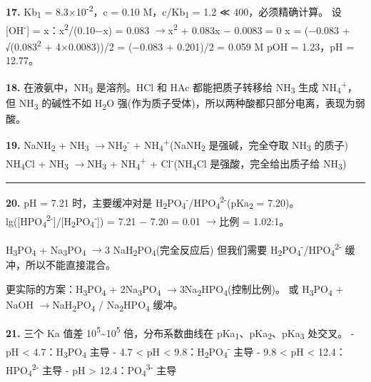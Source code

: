 \documentclass[a4paper,11pt]{ctexart}
\newcommand{\箭}{\ensuremath{\rightarrow}}
\newcommand{\左箭}{\ensuremath{\leftarrow}}
\newcommand{\上箭}{\ensuremath{\uparrow}}
\newcommand{\下箭}{\ensuremath{\downarrow}}
\newcommand{\衡}{\ensuremath{\rightleftharpoons}}
\newcommand{\双箭}{\ensuremath{\leftrightarrow}}
\newcommand{\约等于}{\ensuremath{\approx}}
\newcommand{\小于等于}{\ensuremath{\leq}}
\newcommand{\大于等于}{\ensuremath{\geq}}
\newcommand{\不等于}{\ensuremath{\neq}}
\newcommand{\西格马}{\ensuremath{\sigma}}
\newcommand{\派}{\ensuremath{\pi}}
\begin{document}
\textbf{17.} Kb\textsubscript{1} = 8.3×10\textsuperscript{-2}，c = 0.10 M，c/Kb\textsubscript{1} = 1.2 ≪ 400，必须精确计算。
设 {[}OH\textsuperscript{-}{]} = x：x\textsuperscript{2}/(0.10−x) = 0.083 \箭 x\textsuperscript{2} + 0.083x − 0.0083 = 0
x = (−0.083 + √(0.083\textsuperscript{2} + 4×0.0083))/2 = (−0.083 + 0.201)/2 = 0.059 M
pOH = 1.23，pH = 12.77。

\textbf{18.} 在液氨中，NH\textsubscript{3} 是溶剂。HCl 和 HAc 都能把质子转移给 NH\textsubscript{3} 生成 NH\textsubscript{4}\textsuperscript{+}，但 NH\textsubscript{3} 的碱性不如 H\textsubscript{2}O 强(作为质子受体)，所以两种酸都只部分电离，表现为弱酸。

\textbf{19.} NaNH\textsubscript{2} + NH\textsubscript{3} \箭 NH\textsubscript{2}\textsuperscript{-} + NH\textsubscript{4}\textsuperscript{+}(NaNH\textsubscript{2} 是强碱，完全夺取 NH\textsubscript{3} 的质子)
NH\textsubscript{4}Cl + NH\textsubscript{3} \箭 NH\textsubscript{3} + NH\textsubscript{4}\textsuperscript{+} + Cl\textsuperscript{-}(NH\textsubscript{4}Cl 是强酸，完全给出质子给 NH\textsubscript{3})

\begin{center}\rule{0.5\linewidth}{0.5pt}\end{center}

\textbf{20.} pH = 7.21 时，主要缓冲对是 H\textsubscript{2}PO\textsubscript{4}\textsuperscript{-}/HPO\textsubscript{4}\textsuperscript{2-}(pKa\textsubscript{2} = 7.20)。
lg({[}HPO\textsubscript{4}\textsuperscript{2-}{]}/{[}H\textsubscript{2}PO\textsubscript{4}\textsuperscript{-}{]}) = 7.21 − 7.20 = 0.01 \箭 比例 = 1.02:1。

H\textsubscript{3}PO\textsubscript{4} + Na\textsubscript{3}PO\textsubscript{4} \箭 3 NaH\textsubscript{2}PO\textsubscript{4}(完全反应后)
但我们需要 H\textsubscript{2}PO\textsubscript{4}\textsuperscript{-}/HPO\textsubscript{4}\textsuperscript{2-} 缓冲，所以不能直接混合。

更实际的方案：H\textsubscript{3}PO\textsubscript{4} + 2Na\textsubscript{3}PO\textsubscript{4} \箭 3Na\textsubscript{2}HPO\textsubscript{4}(控制比例)。
或 H\textsubscript{3}PO\textsubscript{4} + NaOH \箭 NaH\textsubscript{2}PO\textsubscript{4} / Na\textsubscript{2}HPO\textsubscript{4} 缓冲。

\textbf{21.} 三个 Ka 值差 10\textsuperscript{5}\textasciitilde10\textsuperscript{5} 倍，分布系数曲线在 pKa\textsubscript{1}、pKa\textsubscript{2}、pKa\textsubscript{3} 处交叉。
- pH \textless{} 4.7：H\textsubscript{3}PO\textsubscript{4} 主导
- 4.7 \textless{} pH \textless{} 9.8：H\textsubscript{2}PO\textsubscript{4}\textsuperscript{-} 主导
- 9.8 \textless{} pH \textless{} 12.4：HPO\textsubscript{4}\textsuperscript{2-} 主导
- pH \textgreater{} 12.4：PO\textsubscript{4}\textsuperscript{3-} 主导
\end{document}
